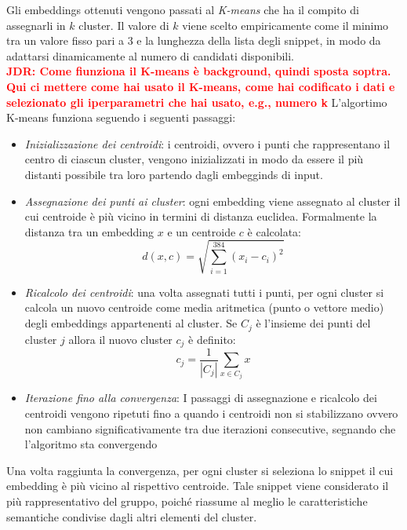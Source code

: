 \documentclass{article}
\newcommand{\JDR}[1]{\textbf{\textcolor{red}{JDR: {#1}}}}
\begin{document}
Gli embeddings ottenuti vengono passati al \textit{K-means} che ha il compito di assegnarli in $k$ cluster. Il valore di $k$ viene scelto empiricamente come il minimo tra un valore fisso pari a 3 e la lunghezza della lista degli snippet, in modo da adattarsi dinamicamente al numero di candidati disponibili.\\
\JDR{Come fiunziona il K-means è background, quindi sposta soptra. Qui ci mettere come hai usato il K-means, come hai codificato i dati e selezionato gli iperparametri che hai usato, e.g., numero k} L'algortimo K-means funziona seguendo i seguenti passaggi:
\begin{itemize}
    \item \textit{Inizializzazione dei centroidi}: i centroidi, ovvero i punti che rappresentano il centro di ciascun cluster, vengono inizializzati in modo da essere il più distanti possibile tra loro partendo dagli embegginds di input.
    \item \textit{Assegnazione dei punti ai cluster}: ogni embedding viene assegnato al cluster il cui centroide è più vicino in termini di distanza euclidea. Formalmente la distanza tra un embedding $x$ e un centroide $c$ è calcolata:
    \begin{equation}
        d(x, c) = \sqrt{\sum_{i=1}^{384} (x_i - c_i)^2}
    \end{equation}
    \item \textit{Ricalcolo dei centroidi}: una volta assegnati tutti i punti, per ogni cluster si calcola un nuovo centroide come media aritmetica (punto o vettore medio) degli embeddings appartenenti al cluster. Se $C_{j}$ è l'insieme dei punti del cluster $j$ allora il nuovo cluster $c_{j}$ è definito:
    \begin{equation}
        c_j = \frac{1}{|C_j|} \sum_{x \in C_j} x
    \end{equation}
    \item \textit{Iterazione fino alla convergenza}: I passaggi di assegnazione e ricalcolo dei centroidi vengono ripetuti fino a quando i centroidi non si stabilizzano ovvero non cambiano significativamente tra due iterazioni consecutive, segnando che l'algoritmo sta convergendo
\end{itemize}
Una volta raggiunta la convergenza, per ogni cluster si seleziona lo snippet il cui embedding è più vicino al rispettivo centroide. Tale snippet viene considerato il più rappresentativo del gruppo, poiché riassume al meglio le caratteristiche semantiche condivise dagli altri elementi del cluster.\\
\end{document}
